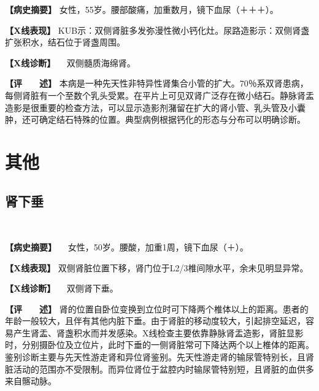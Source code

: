 \textbf{【病史摘要】}
女性，55岁。腰部酸痛，加重数月，镜下血尿（＋＋＋）。

\textbf{【X线表现】}
KUB示：双侧肾脏多发弥漫性微小钙化灶。尿路造影示：双侧肾盏扩张积水，结石位于肾盏周围。

\textbf{【X线诊断】} 　双侧髓质海绵肾。

\textbf{【评　　述】}
本病是一种先天性非特异性肾集合小管的扩大。70％系双肾患病，每侧肾脏有一个至数个乳头受累。在平片上可见双肾广泛存在微小结石。静脉肾盂造影是很重要的检查方法，可以显示造影剂潴留在扩大的肾小管、乳头管及小囊肿，还可确定结石特殊的位置。典型病例根据钙化的形态与分布可以明确诊断。

\section{其他}

\subsection{肾下垂}

\begin{figure}
    \centering
    \\
    \caption{}
    \label{fig6-7-1}
\end{figure}

\textbf{【病史摘要】} 　女性，50岁。腰酸，加重1周，镜下血尿（＋）。

\textbf{【X线表现】}
双侧肾脏位置下移，肾门位于L2/3椎间隙水平，余未见明显异常。

\textbf{【X线诊断】} 　双侧肾下垂。

\textbf{【评　　述】}
肾的位置自卧位变换到立位时可下降两个椎体以上的距离。患者的年龄一般较大，且伴有其他内脏下垂。由于肾脏的移动度较大，引起排空延迟，容易产生肾盂、肾盏积水而并发感染。X线检查主要依靠静脉肾盂造影，肾脏显影时，分别摄卧位及立位片，此时下垂的一侧肾脏常可下降达两个以上椎体的距离。鉴别诊断主要与先天性游走肾和异位肾鉴别。先天性游走肾的输尿管特别长，且肾脏活动的范围亦不受限制。而异位肾位于盆腔内时输尿管特别短，且肾脏的血供多来自髂动脉。


